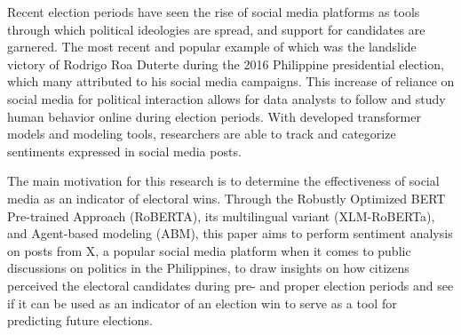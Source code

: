 \begin{thesisabstract}
Recent election periods have seen the rise of social media platforms as tools through which political ideologies are spread, and support for candidates are garnered. The most recent and popular example of which was the landslide victory of Rodrigo Roa Duterte during the 2016 Philippine presidential election, which many attributed to his social media campaigns. This increase of reliance on social media for political interaction allows for data analysts to follow and study human behavior online during election periods. With developed transformer models and modeling tools, researchers are able to track and categorize sentiments expressed in social media posts.

The main motivation for this research is to determine the effectiveness of social media as an indicator of electoral wins. Through the Robustly Optimized BERT Pre-trained Approach (RoBERTA), its multilingual variant (XLM-RoBERTa), and Agent-based modeling (ABM), this paper aims to perform sentiment analysis on posts from X, a popular social media platform when it comes to public discussions on politics in the Philippines, to draw insights on how citizens perceived the  electoral candidates during pre- and proper election periods and see if it can be used as an indicator of an election win to serve as a tool for predicting future elections.
\end{thesisabstract}